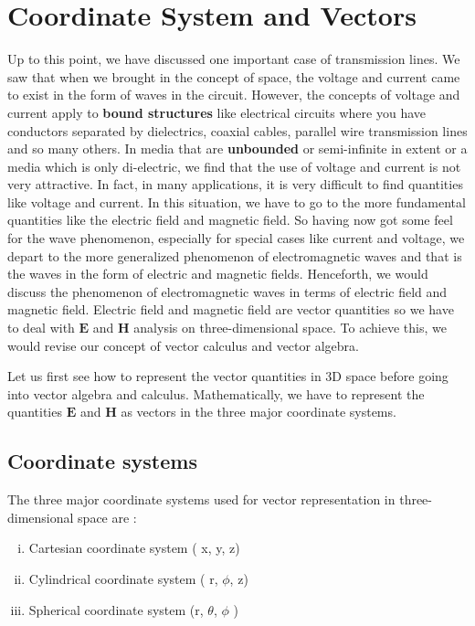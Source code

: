 \chapter{Coordinate System and Vectors}\label{lec:lec16}
Up to this point, we have discussed one important case of transmission lines. We saw that when we brought in the concept of space, the voltage and current came to exist in the form of waves in the circuit. However, the concepts of voltage and current apply to \textbf{bound structures} like electrical circuits where you have conductors separated by dielectrics, coaxial cables, parallel wire transmission lines and so many others. In media that are \textbf{unbounded} or semi-infinite in extent or a media which is only di-electric, we find that the use of voltage and current is not very attractive. In fact, in many applications, it is very difficult to find quantities like voltage and current. In this situation, we have to go to the more fundamental quantities like the electric field and magnetic field. So having now got some feel for the wave phenomenon, especially for special cases like current and voltage, we depart to the more generalized phenomenon of electromagnetic waves and that is the waves in the form of electric and magnetic fields. Henceforth, we would discuss the phenomenon of electromagnetic waves in terms of electric field and magnetic field. Electric field and magnetic field are vector quantities so we have to deal with $\boldsymbol{E}$ and $\boldsymbol{H}$ analysis on three-dimensional space. To achieve this, we would revise our concept of vector calculus and vector algebra.

Let us first see how to represent the vector quantities in 3D space before going into vector algebra and calculus. Mathematically, we have to represent the quantities $\boldsymbol{E}$ and $\boldsymbol{H}$ as vectors in the three major coordinate systems.

\section{Coordinate systems}
The three major coordinate systems  used for vector representation in three-dimensional space are :
\begin{enumerate}[(i)]
\item Cartesian coordinate system ( x, y, z)
\item Cylindrical coordinate system ( r, $\phi$, z)
\item Spherical coordinate system (r,  $\theta$, $\phi$ )
\end{enumerate}

